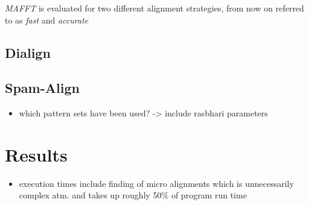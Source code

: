 \textit{MAFFT} is evaluated for two different alignment strategies, from now on referred to as \textit{fast} and \textit{accurate}

\subsection{Dialign}

\subsection{Spam-Align}


\begin{itemize}
	\item which pattern sets have been used? -> include rasbhari parameters
\end{itemize}


\section{Results}

\begin{itemize}
	\item execution times include finding of micro alignments which is unnecessarily complex atm. and takes up roughly 50\% of program run time 
\end{itemize}

